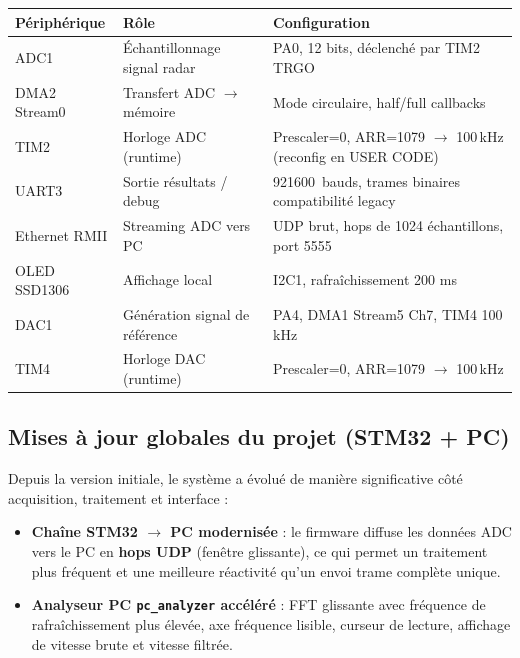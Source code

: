 \documentclass[a4paper,11pt]{article}
\begin{document}
\begin{center}
\small
\begin{tabularx}{\textwidth}{l l X}
\toprule
\rowcolor{lightblue}
\textbf{P\'eriph\'erique} & \textbf{R\^ole} & \textbf{Configuration} \\
\midrule
ADC1           & \'Echantillonnage signal radar     & PA0, 12 bits, d\'eclench\'e par TIM2 TRGO \\
DMA2 Stream0   & Transfert ADC $\to$ m\'emoire         & Mode circulaire, half/full callbacks \\
TIM2           & Horloge ADC (runtime)              & Prescaler=0, ARR=1079 $\rightarrow$ 100\,kHz (reconfig en USER CODE) \\
UART3          & Sortie r\'esultats / debug          & 921600~bauds, trames binaires compatibilit\'e legacy \\
\rowcolor{lightblue}
Ethernet RMII  & Streaming ADC vers PC               & UDP brut, hops de 1024 \'echantillons, port 5555 \\
\rowcolor{lightblue}
OLED SSD1306   & Affichage local                     & I2C1, rafra\^ichissement 200 ms \\
DAC1           & G\'en\'eration signal de r\'ef\'erence    & PA4, DMA1 Stream5 Ch7, TIM4 100\,kHz \\
TIM4           & Horloge DAC (runtime)                 & Prescaler=0, ARR=1079 $\rightarrow$ 100\,kHz \\
\bottomrule
\end{tabularx}

\subsection{Mises \`a jour globales du projet (STM32 + PC)}

Depuis la version initiale, le syst\`eme a \'evolu\'e de mani\`ere significative c\^ot\'e acquisition, traitement et interface :

\begin{itemize}[leftmargin=2em]
  \item \textbf{Cha\^ine STM32 $\rightarrow$ PC modernis\'ee} :
  le firmware diffuse les donn\'ees ADC vers le PC en \textbf{hops UDP} (fen\^etre glissante), ce qui permet un traitement plus fr\'equent et une meilleure r\'eactivit\'e qu'un envoi trame compl\`ete unique.

  \item \textbf{Analyseur PC \texttt{pc\_analyzer} acc\'el\'er\'e} :
  FFT glissante avec fr\'equence de rafra\^ichissement plus \'elev\'ee, axe fr\'equence lisible, curseur de lecture, affichage de vitesse brute et vitesse filtr\'ee.


\end{itemize}
\end{center}
\end{document}

